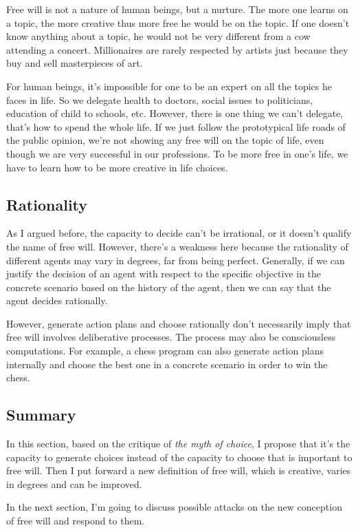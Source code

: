 Free will is not a nature of human beings, but a nurture. The more one learns on a topic, the more creative thus more free he would be on the topic. If one doesn't know anything about a topic, he would not be very different from a cow attending a concert. Millionaires are rarely respected by artists just because they buy and sell masterpieces of art.

For human beings, it's impossible for one to be an expert on all the topics he faces in life. So we delegate health to doctors, social issues to politicians, education of child to schools, etc. However, there is one thing we can't delegate, that's how to spend the whole life. If we just follow the prototypical life roads of the public opinion, we're not showing any free will on the topic of life, even though we are very successful in our professions. To be more free in one's life, we have to learn how to be more creative in life choices.

\subsection{Rationality}

As I argued before, the capacity to decide can't be irrational, or it doesn't qualify the name of free will. However, there’s a weakness here because the rationality of different agents may vary in degrees, far from being perfect. Generally, if we can justify the decision of an agent with respect to the specific objective in the concrete scenario based on the history of the agent, then we can say that the agent decides rationally.

However, generate action plans and choose rationally don’t necessarily imply that free will involves deliberative processes. The process may also be consciousless computations. For example, a chess program can also generate action plans internally and choose the best one in a concrete scenario in order to win the chess.

\subsection{Summary}

In this section, based on the critique of \emph{the myth of choice}, I propose that it's the capacity to generate choices instead of the capacity to choose that is important to free will. Then I put forward a new definition of free will, which is creative, varies in degrees and can be improved.

In the next section, I'm going to discuss possible attacks on the new conception of free will and respond to them.
